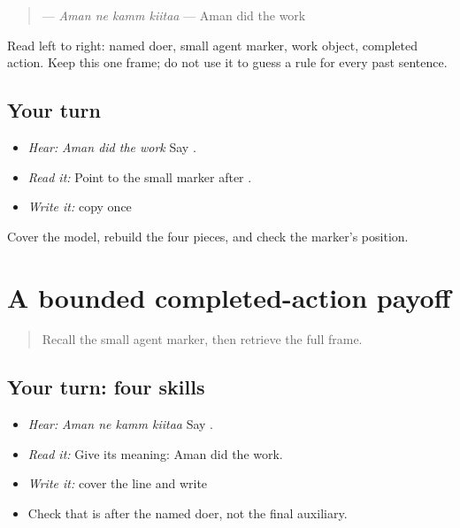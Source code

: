 \begin{grammarlens}[title={Grammar Lens: bounded frame}]
\begin{quote}
\textbf{   } — \emph{Aman ne kamm kiitaa} — Aman did the work
\end{quote}

Read left to right: named doer, small agent marker, work object, completed action. Keep this one frame; do not use it to guess a rule for every past sentence.
\end{grammarlens}

\subsection*{Your turn}
\begin{itemize}
\raggedright
  \item \emph{Hear:} \emph{Aman did the work} Say \textbf{   }.
  \item \emph{Read it:} \textbf{   } Point to the small marker after \textbf{}.
  \item \emph{Write it:} copy \textbf{   } once
\end{itemize}

\begin{tcolorbox}[breakable,colback=teal!4,colframe=teal!35!black,title={Before you move on}]
Cover the model, rebuild the four pieces, and check the marker's position.
\end{tcolorbox}
\section[\texorpdfstring{\pa{ਅਮਨ} \pa{ਨੇ} \pa{ਕੰਮ} \pa{ਕੀਤਾ} (Aman ne kamm kiitaa)}{ਅਮਨ ਨੇ ਕੰਮ ਕੀਤਾ (Aman ne kamm kiitaa)}]{A bounded completed-action payoff}

\label{lesson:PA-C210-payoff}



\begin{quote}
Recall the small agent marker, then retrieve the full frame.
\end{quote}

\subsection*{Your turn: four skills}
\begin{itemize}
\raggedright
  \item \emph{Hear:} \emph{Aman ne kamm kiitaa} Say \textbf{   }.
  \item \emph{Read it:} \textbf{   } Give its meaning: Aman did the work.
  \item \emph{Write it:} cover the line and write \textbf{   }
  \item Check that \textbf{} is after the named doer, not the final auxiliary.
\end{itemize}

